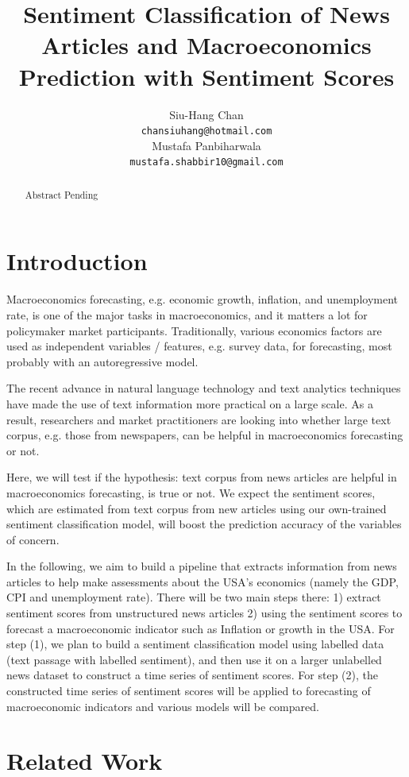 \documentclass[11pt,a4paper]{article}
\title{Sentiment Classification of News Articles and Macroeconomics Prediction with Sentiment Scores}
\author{Siu-Hang Chan \\
  \texttt{chansiuhang@hotmail.com} \\\And
  Mustafa Panbiharwala \\
  \texttt{mustafa.shabbir10@gmail.com} \\}
\date{}
\begin{document}
\maketitle
\begin{abstract}
Abstract Pending
\end{abstract}

\section{Introduction}

Macroeconomics forecasting, e.g. economic growth, inflation, and unemployment rate, is one of the major tasks in macroeconomics, and it matters a lot for policymaker market participants. Traditionally, various economics factors are used as independent variables / features, e.g. survey data, for forecasting, most probably with an autoregressive model.

The recent advance in natural language technology and text analytics techniques have made the use of text information more practical on a large scale. As a result, researchers and market practitioners are looking into whether large text corpus, e.g. those from newspapers, can be helpful in macroeconomics forecasting or not.

Here, we will test if the hypothesis: text corpus from news articles are helpful in macroeconomics forecasting, is true or not. We expect the sentiment scores, which are estimated from text corpus from new articles using our own-trained sentiment classification model, will boost the prediction accuracy of the variables of concern.

In the following, we aim to build a pipeline that extracts information from news articles to help make assessments about the USA's economics (namely the GDP, CPI and unemployment rate). There will be two main steps there: 1) extract sentiment scores from unstructured news articles 2) using the sentiment scores to forecast a macroeconomic indicator such as Inflation or growth in the USA. For step (1), we plan to build a sentiment classification model using labelled data (text passage with labelled sentiment), and then use it on a larger unlabelled news dataset to construct a time series of sentiment scores. For step (2), the constructed time series of sentiment scores will be applied to forecasting of macroeconomic indicators and various models will be compared.


\section{Related Work}
\end{document}
